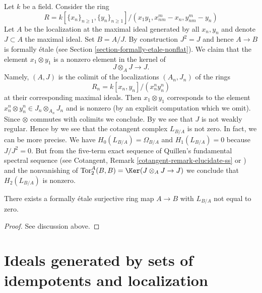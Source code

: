 \noindent
Let $k$ be a field. Consider the ring
$$
R = k[\{x_n\}_{n \geq 1}, \{y_n\}_{n \geq 1}]/(
x_1y_1, x_{nm}^m - x_n, y_{nm}^m - y_n)
$$
Let $A$ be the localization at the maximal ideal generated by
all $x_n, y_n$ and denote $J \subset A$ the maximal ideal. Set $B = A/J$.
By construction $J^2 = J$ and hence $A \to B$ is formally \'etale (see
Section \ref{section-formally-etale-nonflat}).
We claim that the element $x_1 \otimes y_1$ is a nonzero
element in the kernel of
$$
J \otimes_A J \longrightarrow J.
$$
Namely, $(A, J)$ is the colimit of the localizations
$(A_n, J_n)$ of the rings
$$
R_n = k[x_n, y_n]/(x_n^n y_n^n)
$$
at their corresponding maximal ideals. Then
$x_1 \otimes y_1$ corresponds to the element
$x_n^n \otimes y_n^n \in J_n \otimes_{A_n} J_n$ and is nonzero
(by an explicit computation which we omit). Since $\otimes$ commutes
with colimits we conclude. By
\cite[III Section 3.3]{cotangent}
we see that $J$ is not weakly regular. Hence by
\cite[III Proposition 3.3.3]{cotangent}
we see that the cotangent complex $L_{B/A}$ is not zero. In fact, we can
be more precise. We have $H_0(L_{B/A}) = \Omega_{B/A}$ and
$H_1(L_{B/A}) = 0$ because $J/J^2 = 0$. But from the five-term exact sequence
of Quillen's fundamental spectral sequence
(see Cotangent, Remark \ref{cotangent-remark-elucidate-ss} or
\cite[Corollary 8.2.6]{Reinhard})
and the nonvanishing of
$\text{Tor}_2^A(B, B) = \Ker(J \otimes_A J \to J)$ we conclude that
$H_2(L_{B/A})$ is nonzero.

\begin{lemma}
\label{lemma-formally-etale-nontrivial-cotangent-complex}
There exists a formally \'etale surjective ring map $A \to B$
with $L_{B/A}$ not equal to zero.
\end{lemma}

\begin{proof}
See discussion above.
\end{proof}















\section{Ideals generated by sets of idempotents and localization}
\label{section-ideal-locally-idempotents}

